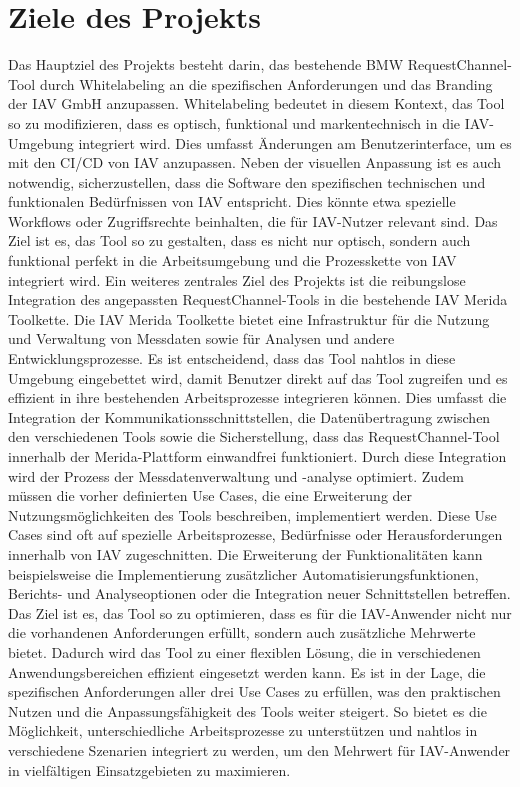 \section{Ziele des Projekts}
Das Hauptziel des Projekts besteht darin, das bestehende BMW RequestChannel-Tool durch Whitelabeling an die spezifischen Anforderungen und das Branding der IAV GmbH anzupassen. Whitelabeling bedeutet in diesem Kontext, das Tool so zu modifizieren, dass es optisch, funktional und markentechnisch in die IAV-Umgebung integriert wird. Dies umfasst Änderungen am Benutzerinterface, um es mit den \ac{CI/CD} von IAV anzupassen. Neben der visuellen Anpassung ist es auch notwendig, sicherzustellen, dass die Software den spezifischen technischen und funktionalen Bedürfnissen von IAV entspricht. Dies könnte etwa spezielle Workflows oder Zugriffsrechte beinhalten, die für IAV-Nutzer relevant sind. Das Ziel ist es, das Tool so zu gestalten, dass es nicht nur optisch, sondern auch funktional perfekt in die Arbeitsumgebung und die Prozesskette von IAV integriert wird.
\newline
\newline
Ein weiteres zentrales Ziel des Projekts ist die reibungslose Integration des angepassten RequestChannel-Tools in die bestehende IAV Merida Toolkette. Die IAV Merida Toolkette bietet eine Infrastruktur für die Nutzung und Verwaltung von Messdaten sowie für Analysen und andere Entwicklungsprozesse. Es ist entscheidend, dass das Tool nahtlos in diese Umgebung eingebettet wird, damit Benutzer direkt auf das Tool zugreifen und es effizient in ihre bestehenden Arbeitsprozesse integrieren können. Dies umfasst die Integration der Kommunikationsschnittstellen, die Datenübertragung zwischen den verschiedenen Tools sowie die Sicherstellung, dass das RequestChannel-Tool innerhalb der Merida-Plattform einwandfrei funktioniert. Durch diese Integration wird der Prozess der Messdatenverwaltung und -analyse optimiert.
\newline
\newline
Zudem müssen die vorher definierten Use Cases, die eine Erweiterung der Nutzungsmöglichkeiten des Tools beschreiben, implementiert werden. Diese Use Cases sind oft auf spezielle Arbeitsprozesse, Bedürfnisse oder Herausforderungen innerhalb von IAV zugeschnitten. Die Erweiterung der Funktionalitäten kann beispielsweise die Implementierung zusätzlicher Automatisierungsfunktionen, Berichts- und Analyseoptionen oder die Integration neuer Schnittstellen betreffen. Das Ziel ist es, das Tool so zu optimieren, dass es für die IAV-Anwender nicht nur die vorhandenen Anforderungen erfüllt, sondern auch zusätzliche Mehrwerte bietet. Dadurch wird das Tool zu einer flexiblen Lösung, die in verschiedenen Anwendungsbereichen effizient eingesetzt werden kann. Es ist in der Lage, die spezifischen Anforderungen aller drei Use Cases zu erfüllen, was den praktischen Nutzen und die Anpassungsfähigkeit des Tools weiter steigert. So bietet es die Möglichkeit, unterschiedliche Arbeitsprozesse zu unterstützen und nahtlos in verschiedene Szenarien integriert zu werden, um den Mehrwert für IAV-Anwender in vielfältigen Einsatzgebieten zu maximieren.
\label{chap:kapitel2}

